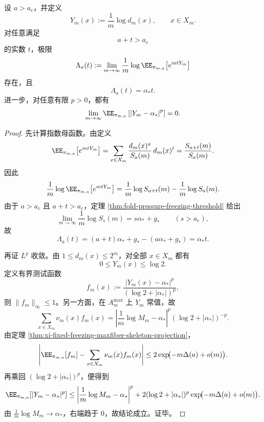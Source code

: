 \begin{theorem}[冻结相中的纤维指数自平均]\label{thm:xi-fixed-freezing-fiber-exponent-selfaveraging}
设 \(a>a_{\mathrm c}\)，并定义
\[
Y_m(x):=\frac{1}{m}\log d_m(x),
\qquad
x\in X_m.
\]
对任意满足
\[
a+t>a_{\mathrm c}
\]
的实数 \(t\)，极限
\[
\Lambda_a(t):=
\lim_{m\to\infty}
\frac1m
\log \EE_{\pi_{m,a}}\!\left[e^{mtY_m}\right]
\]
存在，且
\[
\Lambda_a(t)=\alpha_* t.
\]
进一步，对任意有限 \(p>0\)，都有
\[
\lim_{m\to\infty}
\EE_{\pi_{m,a}}
\left[
\left|Y_m-\alpha_*\right|^p
\right]
=0.
\]
\end{theorem}
\begin{proof}
先计算指数母函数。由定义
\[
\EE_{\pi_{m,a}}\!\left[e^{mtY_m}\right]
=
\sum_{x\in X_m}\frac{d_m(x)^a}{S_a(m)}\,d_m(x)^t
=
\frac{S_{a+t}(m)}{S_a(m)}.
\]
因此
\[
\frac1m
\log \EE_{\pi_{m,a}}\!\left[e^{mtY_m}\right]
=
\frac1m\log S_{a+t}(m)-\frac1m\log S_a(m).
\]
由于 \(a>a_{\mathrm c}\) 且 \(a+t>a_{\mathrm c}\)，定理 \ref{thm:fold-pressure-freezing-threshold} 给出
\[
\lim_{m\to\infty}\frac1m\log S_s(m)=s\alpha_*+g_*
\qquad
(s>a_{\mathrm c}),
\]
故
\[
\Lambda_a(t)
=
(a+t)\alpha_*+g_*-(a\alpha_*+g_*)
=
\alpha_* t.
\]

再证 \(L^p\) 收敛。由 \(1\le d_m(x)\le 2^m\)，对全部 \(x\in X_m\) 都有
\[
0\le Y_m(x)\le \log 2.
\]
定义有界测试函数
\[
f_m(x):=\frac{|Y_m(x)-\alpha_*|^p}{(\log 2+|\alpha_*|)^p},
\]
则 \(\|f_m\|_\infty\le 1\)。另一方面，在 \(A_m^{\max}\) 上 \(Y_m\) 常值，故
\[
\sum_{x\in X_m}\nu_m(x)f_m(x)
=
\left|
\frac1m\log M_m-\alpha_*
\right|^p
(\log 2+|\alpha_*|)^{-p}.
\]
由定理 \ref{thm:xi-fixed-freezing-maxfiber-skeleton-projection}，
\[
\left|
\EE_{\pi_{m,a}}[f_m]-\sum_{x\in X_m}\nu_m(x)f_m(x)
\right|
\le
2\exp\!\bigl(-m\Delta(a)+o(m)\bigr).
\]
再乘回 \((\log 2+|\alpha_*|)^p\)，便得到
\[
\EE_{\pi_{m,a}}\!\left[|Y_m-\alpha_*|^p\right]
\le
\left|
\frac1m\log M_m-\alpha_*
\right|^p
+2(\log 2+|\alpha_*|)^p
\exp\!\bigl(-m\Delta(a)+o(m)\bigr).
\]
由 \(\frac1m\log M_m\to\alpha_*\)，右端趋于 \(0\)，故结论成立。证毕。
\end{proof}

\endinput
